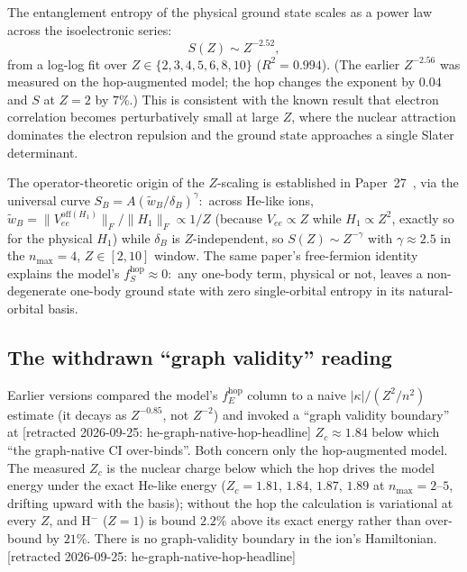 \documentclass[twocolumn,pra,amsmath,amssymb,superscriptaddress]{revtex4-2}
\begin{document}
The entanglement entropy of the physical ground state scales as a
power law across the isoelectronic series:
\begin{equation}
  S(Z) \sim Z^{-2.52},
  \label{eq:scaling}
\end{equation}
from a log-log fit over $Z \in \{2,3,4,5,6,8,10\}$ ($R^2 = 0.994$).
(The earlier $Z^{-2.56}$ was measured on the hop-augmented model;
the hop changes the exponent by $0.04$ and $S$ at $Z=2$ by $7\%$.)
This is consistent with the known result that electron correlation
becomes perturbatively small at large $Z$, where the nuclear
attraction dominates the electron repulsion and the ground state
approaches a single Slater determinant.

The operator-theoretic origin of the $Z$-scaling is established in
Paper~27~\cite{GeoVac_Paper27}, via the universal curve
$S_B = A(\tilde{w}_B/\delta_B)^{\gamma}$:\ across He-like ions,
$\tilde{w}_B = \lVert V_{ee}^{\mathrm{off}(H_1)}\rVert_F /
\lVert H_1\rVert_F \propto 1/Z$ (because $V_{ee}\propto Z$ while
$H_1\propto Z^{2}$, exactly so for the physical $H_1$) while $\delta_B$
is $Z$-independent, so $S(Z) \sim Z^{-\gamma}$ with
$\gamma \approx 2.5$ in the $n_{\max}=4$, $Z\in[2,10]$ window.  The
same paper's free-fermion identity explains the model's
$f_S^{\text{hop}} \approx 0$:\ any one-body term, physical or not,
leaves a non-degenerate one-body ground state with zero single-orbital
entropy in its natural-orbital basis.

\subsection{The withdrawn ``graph validity'' reading}

Earlier versions compared the model's $f_E^{\text{hop}}$ column to a
naive $|\kappa|/(Z^2/n^2)$ estimate (it decays as $Z^{-0.85}$, not
$Z^{-2}$) and invoked a ``graph validity boundary'' at [retracted 2026-09-25: he-graph-native-hop-headline]
$Z_c \approx 1.84$ below which ``the graph-native CI over-binds''.
Both concern only the hop-augmented model.  The measured $Z_c$ is the
nuclear charge below which the hop drives the model energy under the
exact He-like energy ($Z_c = 1.81$, $1.84$, $1.87$, $1.89$ at
$n_{\max}=2$--$5$, drifting upward with the basis); without the hop the
calculation is variational at every $Z$, and H$^-$ ($Z=1$) is bound
$2.2\%$ above its exact energy rather than over-bound by $21\%$.  There
is no graph-validity boundary in the ion's Hamiltonian. [retracted 2026-09-25: he-graph-native-hop-headline]
\end{document}
